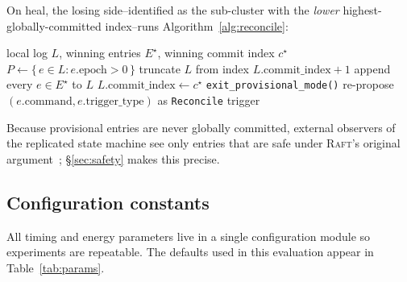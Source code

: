 \documentclass[conference]{IEEEtran}
\newcommand{\echoproto}{\textsc{Echo}\xspace}
\newcommand{\raftproto}{\textsc{Raft}\xspace}
\begin{document}
On heal, the losing side--identified as the sub-cluster with the
\emph{lower} highest-globally-committed index--runs
Algorithm~\ref{alg:reconcile}:
\begin{algorithm}[H]
\small
\caption{Reconciliation on the losing sub-cluster after heal.}
\label{alg:reconcile}
\begin{algorithmic}[1]
\REQUIRE local log $L$, winning entries $E^\star$, winning commit
  index $c^\star$
\STATE $P \leftarrow \{\, e \in L : e.\text{epoch} > 0 \,\}$
  \hfill{}
  \STATE truncate $L$ from index $L.\text{commit\_index}{+}1$
  \STATE append every $e \in E^\star$ to $L$
  \STATE $L.\text{commit\_index} \leftarrow c^\star$
\ENDIF
\STATE \texttt{exit\_provisional\_mode()}
  \STATE re-propose $(e.\text{command}, e.\text{trigger\_type})$ as
         \texttt{Reconcile} trigger
\ENDFOR
\end{algorithmic}
\end{algorithm}

Because provisional entries are never globally committed, external
observers of the replicated state machine see only entries that are
safe under \raftproto's original argument~\cite{howard2021arc};
\S\ref{sec:safety} makes this precise.

\subsection{Configuration constants}
All timing and energy parameters live in a single configuration module
so experiments are repeatable. The defaults used in this evaluation
appear in Table~\ref{tab:params}.

\begin{table}[t]
\centering
\caption{Default protocol parameters (identical across \raftproto\ and
\echoproto).}
\label{tab:params}
\setlength{\tabcolsep}{3pt}
\end{table}
\end{document}
